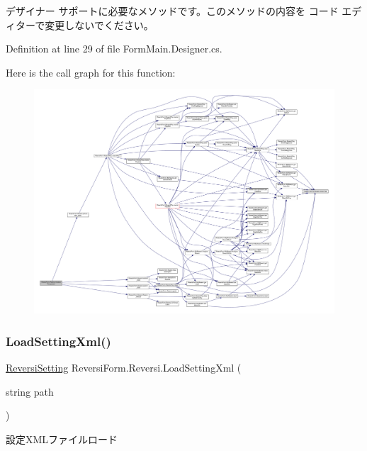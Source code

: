 デザイナー サポートに必要なメソッドです。このメソッドの内容を コード エディターで変更しないでください。 



Definition at line 29 of file Form\+Main.\+Designer.\+cs.

Here is the call graph for this function\+:\nopagebreak
\begin{figure}[H]
\begin{center}
\leavevmode
\includegraphics[width=350pt]{class_reversi_form_1_1_reversi_abec0816dd006d05b512d86b45a20af68_cgraph}
\end{center}
\end{figure}
\mbox{\label{class_reversi_form_1_1_reversi_afbe64672e4a4c9e6f6404a3bbf2b5e1d}} 
\subsubsection{\texorpdfstring{Load\+Setting\+Xml()}{LoadSettingXml()}}
{\footnotesize\ttfamily \hyperlink{class_reversi_form_1_1_reversi_setting}{Reversi\+Setting} Reversi\+Form.\+Reversi.\+Load\+Setting\+Xml (\begin{DoxyParamCaption}\item[{string}]{path }\end{DoxyParamCaption})}



設定\+X\+M\+Lファイルロード 


